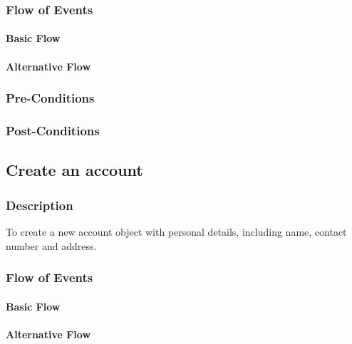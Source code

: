 \documentclass[a4paper,12pt]{article}
\begin{document}
\subsubsection{Flow of Events}
\paragraph{Basic Flow}
\begin{itemize}
\end{itemize}

\paragraph{Alternative Flow}
\begin{itemize}
\end{itemize}

\subsubsection{Pre-Conditions}
\subsubsection{Post-Conditions}

\subsection{Create an account}
\subsubsection{Description}
To create a new account object with personal details, including name, contact number and address.
\subsubsection{Flow of Events}
\paragraph{Basic Flow}
\begin{itemize}
\end{itemize}

\paragraph{Alternative Flow}
\begin{itemize}
\end{itemize}
\end{document}
